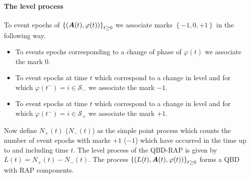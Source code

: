\paragraph{The level process}
To event epochs of \(\left\{(\boldsymbol A(t),{\varphi}(t))\right\}_{t\geq0}\) we associate marks \(\left\{-1,0,+1\right\}\) in the following way.
\begin{itemize}
	\item To events epochs corresponding to a change of phase of \( {\varphi}(t)\) we associate the mark \(0\).
	\item To event epochs at time \(t\) which correspond to a change in level and for which \( {\varphi}(t^-)=i\in\mathcal S_-\) we associate the mark \(-1\).
	\item To event epochs at time \(t\) which correspond to a change in level and for which \( {\varphi}(t^-)=i\in\mathcal S_+\) we associate the mark \(+1\).
\end{itemize}
Now define \(N_+(t)\) (\(N_-(t)\)) as the simple point process which counts the number of event epochs with marks \(+1\) (\(-1\)) which have occurred in the time up to and including time \(t\). The level process of the QBD-RAP is given by \( L(t) = N_+(t)-N_-(t)\). The process \(\left\{(L(t),\boldsymbol A(t),\varphi(t))\right\}_{t\geq 0}\) forms a QBD with RAP components.

